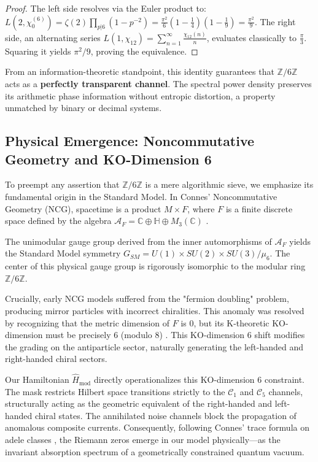 \documentclass[aps,prl,preprint,superscriptaddress,floatfix]{revtex4-2}
\newcommand{\Zmod}{\mathbb{Z}/6\mathbb{Z}}
\begin{document}
\begin{proof}
The left side resolves via the Euler product to:
$L(2, \chi_0^{(6)}) = \zeta(2) \prod_{p|6} (1-p^{-2}) = \frac{\pi^2}{6} \left(1-\frac{1}{4}\right)\left(1-\frac{1}{9}\right) = \frac{\pi^2}{9}$.
The right side, an alternating series $L(1, \chi_{12}) = \sum_{n=1}^\infty \frac{\chi_{12}(n)}{n}$, evaluates classically to $\frac{\pi}{3}$. Squaring it yields $\pi^2/9$, proving the equivalence.
\end{proof}

From an information-theoretic standpoint, this identity guarantees that $\Zmod$ acts as a \textbf{perfectly transparent channel}. The spectral power density preserves its arithmetic phase information without entropic distortion, a property unmatched by binary or decimal systems.

\subsection{Physical Emergence: Noncommutative Geometry and KO-Dimension 6}

To preempt any assertion that $\Zmod$ is a mere algorithmic sieve, we emphasize its fundamental origin in the Standard Model. In Connes' Noncommutative Geometry (NCG), spacetime is a product $M \times F$, where $F$ is a finite discrete space defined by the algebra $\mathcal{A}_F = \mathbb{C} \oplus \mathbb{H} \oplus M_3(\mathbb{C})$ \cite{Connes2008}.

The unimodular gauge group derived from the inner automorphisms of $\mathcal{A}_F$ yields the Standard Model symmetry $G_{SM} = U(1) \times SU(2) \times SU(3) / \mu_6$. The center of this physical gauge group is rigorously isomorphic to the modular ring $\mathbb{Z}/6\mathbb{Z}$. 

Crucially, early NCG models suffered from the "fermion doubling" problem, producing mirror particles with incorrect chiralities. This anomaly was resolved by recognizing that the metric dimension of $F$ is 0, but its K-theoretic KO-dimension must be precisely 6 (modulo 8) \cite{Chamseddine2007}. This KO-dimension 6 shift modifies the grading on the antiparticle sector, naturally generating the left-handed and right-handed chiral sectors. 

Our Hamiltonian $\hat{H}_{\text{mod}}$ directly operationalizes this KO-dimension 6 constraint. The mask restricts Hilbert space transitions strictly to the $\mathcal{C}_1$ and $\mathcal{C}_5$ channels, structurally acting as the geometric equivalent of the right-handed and left-handed chiral states. The annihilated noise channels block the propagation of anomalous composite currents. Consequently, following Connes' trace formula on adele classes \cite{Connes1999}, the Riemann zeros emerge in our model physically—as the invariant absorption spectrum of a geometrically constrained quantum vacuum.
\end{document}
